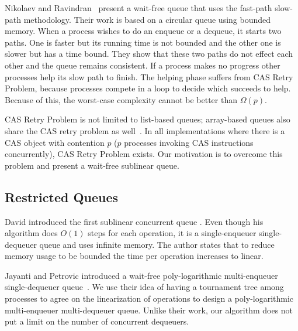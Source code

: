 \documentclass[10pt]{article}
\newcommand{\nf}[1]{{\normalfont{\texttt{#1}}}}
\theoremstyle{definition}
\begin{document}
Nikolaev and Ravindran~\cite{DBLP:journals/corr/abs-2201-02179} present a wait-free queue that uses the fast-path slow-path methodology. Their work is based on a circular queue using bounded memory. When a process wishes to do an enqueue or a dequeue, it starts two paths. One is faster but its running time is not bounded and the other one is slower but has a time bound. They show that these two paths do not effect each other and the queue remains consistent. If a process makes no progress other processes help its slow path to finish. The helping phase suffers from CAS Retry Problem, because processes compete in a \nf{CAS} loop to decide which succeeds to help. Because of this, the worst-case complexity cannot be better than $\Omega(p)$.

CAS Retry Problem is not limited to list-based queues; array-based queues also share the CAS retry problem as well~\cite{DBLP:conf/iceccs/ColvinG05,DBLP:conf/icdcn/Shafiei09,DBLP:conf/spaa/TsigasZ01}. In all implementations where there is a CAS object with contention $p$ ($p$ processes invoking CAS instructions concurrently), CAS Retry Problem exists. Our motivation is to overcome this problem and present a wait-free sublinear queue.

\subsection{Restricted Queues}

David introduced the first sublinear concurrent queue \cite{DBLP:conf/wdag/David04}. Even though his algorithm does $O(1)$ steps for each operation, it is a single-enqueuer single-dequeuer queue and uses infinite memory.
The author states that to reduce memory usage to be bounded the time per operation increases to linear.

Jayanti and Petrovic introduced a wait-free poly-logarithmic multi-enqueuer single-dequeuer queue~\cite{DBLP:conf/fsttcs/JayantiP05}. We use their idea of having a tournament tree among processes to agree on the linearization of operations to design a poly-logarithmic multi-enqueuer multi-dequeuer queue. Unlike their work, our algorithm does not put a limit on the number of concurrent dequeuers. 
\end{document}
